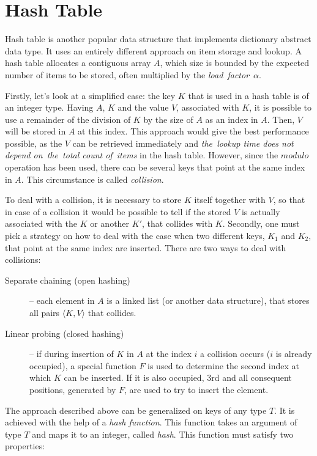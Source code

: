 \section{Hash Table}

Hash table is another popular data structure that implements dictionary abstract data type. It uses an entirely different approach on item storage and lookup. A hash table allocates a contiguous array $A$, which size is bounded by the expected number of items to be stored, often multiplied by the \mbox{\emph{load~factor}~$\alpha$}.

Firstly, let’s look at a simplified case: the key $K$ that is used in a hash table is of an integer type. Having $A$, $K$ and the value $V$, associated with $K$, it is possible to use a remainder of the division of $K$ by the size of $A$ as an index in $A$. Then, $V$ will be stored in $A$ at this index. This approach would give the best performance possible, as the $V$ can be retrieved immediately and \emph{the~lookup time does not depend on~the~total count of~items} in the hash table. However, since the $modulo$ operation has been used, there can be several keys that point at the same index in $A$. This circumstance is called \emph{collision}.

To deal with a collision, it is necessary to store $K$ itself together with $V$, so that in case of a collision it would be possible to tell if the stored $V$ is actually associated with the $K$ or another $K'$, that collides with $K$. Secondly, one must pick a strategy on how to deal with the case when two different keys, $K_1$ and $K_2$, that point at the same index are inserted. There are two ways to deal with collisions:
\begin{description}
\item[Separate chaining (open hashing)]-- each element in $A$ is a linked list (or another data structure), that stores all pairs $\langle K, V\rangle$ that collides.
\item[Linear probing (closed hashing)]-- if during insertion of $K$ in $A$ at the index $i$ a collision occurs ($i$ is already occupied), a special function $F$ is used to determine the second index at which $K$ can be inserted. If it is also occupied, 3rd and all consequent positions, generated by $F$, are used to try to insert the element.
\end{description}

The approach described above can be generalized on keys of any type $T$. It is achieved with the help of a \emph{hash function}. This function takes an argument of type $T$ and maps it to an integer, called \emph{hash}. This function must satisfy two properties:

